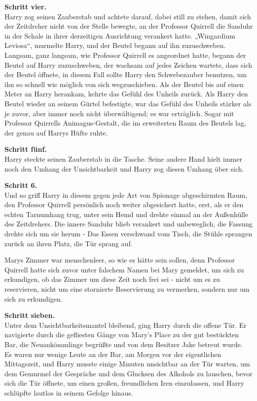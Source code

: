 {\textbf{Schritt vier.}\\ Harry zog seinen Zauberstab und achtete darauf, dabei still zu stehen, damit sich der Zeitdreher nicht von der Stelle bewegte, an der Professor Quirrell die Sanduhr in der Schale in ihrer derzeitigen Ausrichtung verankert hatte. „Wingardium Leviosa“, murmelte Harry, und der Beutel begann auf ihn zuzuschweben. Langsam, ganz langsam, wie Professor Quirrell es angeordnet hatte, begann der Beutel auf Harry zuzuschweben, der wachsam auf jedes Zeichen wartete, dass sich der Beutel öffnete, in diesem Fall sollte Harry den Schwebezauber benutzen, um ihn so schnell wie möglich von sich wegzuschieben. Als der Beutel bis auf einen Meter an Harry herankam, kehrte das Gefühl des Unheils zurück. Als Harry den Beutel wieder an seinem Gürtel befestigte, war das Gefühl des Unheils stärker als je zuvor, aber immer noch nicht überwältigend; es war erträglich. Sogar mit Professor Quirrells Animagus-Gestalt, die im erweiterten Raum des Beutels lag, der genau auf Harrys Hüfte ruhte.

\textbf{Schritt fünf.}\\ Harry steckte seinen Zauberstab in die Tasche. Seine andere Hand hielt immer noch den Umhang der Unsichtbarkeit und Harry zog diesen Umhang über sich.

\textbf{Schritt 6.}\\ Und so griff Harry in diesem gegen jede Art von Spionage abgeschirmten Raum, den Professor Quirrell persönlich noch weiter abgesichert hatte, erst, als er den echten Tarnumhang trug, unter sein Hemd und drehte einmal an der Außenhülle des Zeitdrehers. Die innere Sanduhr blieb verankert und unbeweglich, die Fassung drehte sich um sie herum - Das Essen verschwand vom Tisch, die Stühle sprangen zurück an ihren Platz, die Tür sprang auf.

Marys Zimmer war menschenleer, so wie es hätte sein sollen, denn Professor Quirrell hatte sich zuvor unter falschem Namen bei Mary gemeldet, um sich zu erkundigen, ob das Zimmer um diese Zeit noch frei sei - nicht um es zu reservieren, nicht um eine stornierte Reservierung zu vermerken, sondern nur um sich zu erkundigen.

\textbf{Schritt sieben.}\\ Unter dem Unsichtbarkeitsmantel bleibend, ging Harry durch die offene Tür. Er navigierte durch die gefliesten Gänge von Mary's Place zu der gut bestückten\\ Bar, die Neuankömmlinge begrüßte und von dem Besitzer Jake betreut wurde.\\ Es waren nur wenige Leute an der Bar, am Morgen vor der eigentlichen Mittagszeit, und Harry musste einige Minuten unsichtbar an der Tür warten, um dem Gemurmel der Gespräche und dem Glucksen des Alkohols zu lauschen, bevor sich die Tür öffnete, um einen großen, freundlichen Iren einzulassen, und Harry schlüpfte lautlos in seinem Gefolge hinaus.

}

